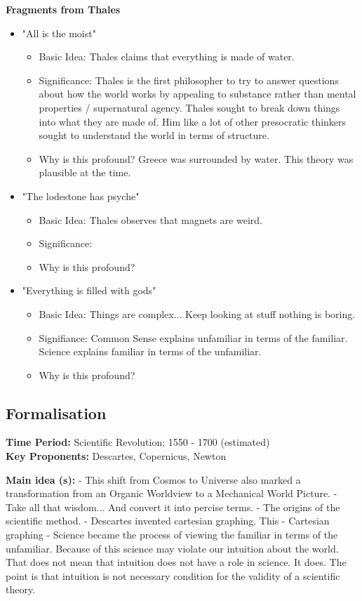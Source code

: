 \documentclass[twoside]{article}
\begin{document}
\textbf{Fragments from Thales}
\begin{itemize}
  \item "All is the moist"
    \begin{itemize}
      \item Basic Idea: Thales claims that everything is made of water.
      \item Significance: Thales is the first philosopher to try to answer questions
            about how the world works by appealing to substance rather than mental
            properties / supernatural agency. Thales sought to break down things into
            what they are made of. Him like a lot of other presocratic thinkers
            sought to understand the world in terms of structure.
      \item Why is this profound? Greece was surrounded by water. This theory
            was plausible at the time.
    \end{itemize}
  \item "The lodestone has psyche"
    \begin{itemize}
      \item Basic Idea: Thales observes that magnets are weird.
      \item Significance:
      \item Why is this profound?
    \end{itemize}
  \item "Everything is filled with gods"
    \begin{itemize}
      \item Basic Idea: Things are complex... Keep looking at stuff nothing is boring.
      \item Signifiance: Common Sense explains unfamiliar in terms of the familiar.
      Science explains familiar in terms of the unfamiliar.
      \item Why is this profound?
    \end{itemize}
\end{itemize}

\subsection{Formalisation}
\textbf{Time Period: } Scientific Revolution; 1550 - 1700 (estimated) \\
\textbf{Key Proponents: } Descartes, Copernicus, Newton

\textbf{Main idea (s): }
- This shift from Cosmos to Universe also marked a transformation from an Organic
Worldview to a Mechanical World Picture.
- Take all that wisdom... And convert it into percise terms.
- The origins of the scientific method.
- Descartes invented cartesian graphing. This
- Cartesian graphing
- Science became the process of viewing the familiar in terms of the unfamiliar. Because
of this science may violate our intuition about the world. That does not mean
that intuition does not have a role in science. It does. The point is that intuition
is not necessary condition for the validity of a scientific theory.
\end{document}
